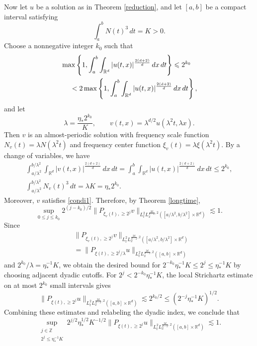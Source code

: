 \documentclass[reqno,11pt]{amsart}
\theoremstyle{plain}
\theoremstyle{definition}
\numberwithin{equation}{section}
\numberwithin{theorem}{section}
\def\geq{\geqslant}
\def\leq{\leqslant}
\def\R{\mathbb{R}}
\begin{document}
Now let $u$ be a solution as in Theorem \ref{reduction}, and let $[a,b]$ be a compact interval satisfying
\[
 \int_a^bN(t)^3\,dt=K>0.
\]
Choose a nonnegative integer $k_0$ such that
\begin{align*}
 &\max\left\{1,\int_a^b\int_{\R^d}|u(t,x)|^{\frac{2(d+2)}d}\,dx\,dt\right\}
 \leq 2^{k_0}\\
 &\hspace{3ex}<2\max\left\{1,\int_a^b\int_{\R^d}|u(t,x)|^{\frac{2(d+2)}d}\,dx\,dt\right\},
\end{align*}
and let
\[
 \lambda=\frac{\eta_{\ast}2^{k_0}}K,
 \qquad v(t,x)=\lambda^{d/2}u(\lambda^2t,\lambda x).
\]
Then $v$ is an almost-periodic solution with frequency scale function
$N_v(t)=\lambda N(\lambda^2t)$ and frequency center function
$\xi_v(t)=\lambda\xi(\lambda^2t)$. By a change of variables, we have
\begin{gather*}
 \int_{a/\lambda^2}^{b/\lambda^2}\int_{\R^d}|v(t,x)|^{\frac{2(d+2)}d}\,dx\,dt
 =\int_a^b\int_{\R^d}|u(t,x)|^{\frac{2(d+2)}d}\,dx\,dt\leq2^{k_0},\\
 \int_{a/\lambda^2}^{b/\lambda^2}N_v(t)^3\,dt
 =\lambda K=\eta_{\ast}2^{k_0}.
\end{gather*}
Moreover, $v$ satisfies \eqref{condi1}. Therefore, by Theorem \ref{longtime},
\[
 \sup_{0\leq j\leq k_0}2^{(j-k_0)/2}
 \|P_{\xi_v(t),\geq2^j}v\|_{L_t^2L_x^{\frac{2d}{d-2},2}
 ([a/\lambda^2,b/\lambda^2]\times\R^d)}\lesssim1.
\]
Since
\begin{align*}
 &\|P_{\xi_v(t),\geq2^j}v\|_{L_t^2L_x^{\frac{2d}{d-2},2}
 ([a/\lambda^2,b/\lambda^2]\times\R^d)}\\
 &=\|P_{\xi(t),\geq2^j/\lambda}u\|_{L_t^2L_x^{\frac{2d}{d-2},2}([a,b]\times\R^d)}
\end{align*}
and $2^{k_0}/\lambda=\eta_{\ast}^{-1}K$, we obtain the desired bound for
$2^{-k_0}\eta_{\ast}^{-1}K\leq2^j\leq\eta_{\ast}^{-1}K$ by choosing adjacent dyadic cutoffs.
For $2^j<2^{-k_0}\eta_{\ast}^{-1}K$, the local Strichartz estimate on at most
$2^{k_0}$ small intervals gives
\[
 \|P_{\xi(t),\geq2^j}u\|_{L_t^2L_x^{\frac{2d}{d-2},2}([a,b]\times\R^d)}
 \lesssim2^{k_0/2}\leq(2^{-j}\eta_{\ast}^{-1}K)^{1/2}.
\]
Combining these estimates and relabeling the dyadic index, we conclude that
\begin{equation}\label{longtime02}
 \sup_{\substack{j\in\mathbb Z\\2^j\leq\eta_{\ast}^{-1}K}}
 2^{j/2}\eta_{\ast}^{1/2}K^{-1/2}
 \|P_{\xi(t),\geq2^j}u\|_{L_t^2L_x^{\frac{2d}{d-2},2}([a,b]\times\R^d)}
 \lesssim1.
\end{equation}
\end{document}
